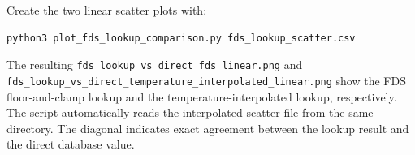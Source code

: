\documentclass[11pt]{article}
\begin{document}
Create the two linear scatter plots with:

\begin{verbatim}
python3 plot_fds_lookup_comparison.py fds_lookup_scatter.csv
\end{verbatim}

The resulting \texttt{fds\_lookup\_vs\_direct\_fds\_linear.png} and
\texttt{fds\_lookup\_vs\_direct\_temperature\_interpolated\_linear.png}
show the FDS floor-and-clamp lookup and the temperature-interpolated lookup,
respectively. The script automatically reads the interpolated scatter file
from the same directory. The diagonal indicates exact agreement between the
lookup result and the direct database value.
\end{document}
